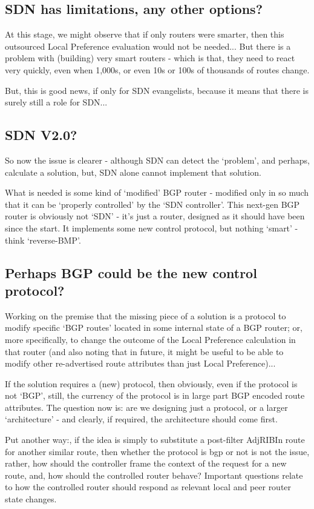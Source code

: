 \subsection{SDN has limitations, any other options?}
At this stage, we might observe that if only routers were smarter, then this
outsourced Local Preference evaluation would not be needed...
But there is a problem with (building) very smart routers - which is that, they
need to react very quickly, even when 1,000s, or even 10s or 100s of thousands
of routes change.

But, this is good news, if only for SDN evangelists, because it means
that there is surely still a role for SDN...

\subsection{SDN V2.0?}
So now the issue is clearer - although SDN can detect the `problem', and perhaps,
calculate a solution, but, SDN alone cannot implement that solution.

What is needed is some kind of `modified' BGP router - modified only in so much that it
can be `properly controlled' by the `SDN controller'.  This next-gen BGP router
is obviously not `SDN' - it's just a router, designed as it should have been
since the start.  It implements some new control protocol, but nothing `smart'
- think `reverse-BMP'.

\subsection{Perhaps BGP could be the new control protocol?}
Working on the premise that the missing piece of a solution is a protocol
to modify specific `BGP routes' located in some internal state of a BGP
router; or, more specifically, to change the outcome of the Local Preference
calculation in that router (and also noting that in future, it might be useful
to be able to modify other re-advertised route attributes than just Local Preference)...

If the solution requires a (new) protocol, then obviously,
even if the protocol is not `BGP', still, the currency of
the protocol is in large part BGP encoded route attributes.
The question now is:  are we designing just a protocol,
or a larger `architecture'
- and clearly, if required, the architecture should come first.

Put another way:, if the idea is simply to substitute a post-filter AdjRIBIn route for
another similar route, then whether the protocol is bgp or not is not the
issue, rather, how should the controller frame the context of the request for a
new route, and, how should the controlled router behave?
Important questions relate to how the controlled router should respond as
relevant local and peer router state changes.

